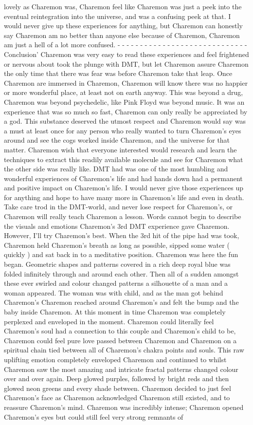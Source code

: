 \documentclass[12pt]{book}
\begin{document}
lovely as Charemon was, Charemon feel like Charemon was just a peek into the eventual reintegration into the universe, and was a confusing peek at that. I would never give up these experiences for anything, but Charemon can honestly say Charemon am no better than anyone else because of Charemon, Charemon am just a hell of a lot more confused. - - - - - - - - - - - - - - - - - - - - - - - - - - - - -Conclusion' Charemon was very easy to read these experiences and feel frightened or nervous about took the plunge with DMT, but let Charemon assure Charemon the only time that there was fear was before Charemon take that leap. Once Charemon are immersed in Charemon, Charemon will know there was no happier or more wonderful place, at least not on earth anyway. This was beyond a drug, Charemon was beyond psychedelic, like Pink Floyd was beyond music. It was an experience that was so much so fast, Charemon can only really be appreciated by a god. This substance deserved the utmost respect and Charemon would say was a must at least once for any person who really wanted to turn Charemon's eyes around and see the cogs worked inside Charemon, and the universe for that matter. Charemon wish that everyone interested would research and learn the techniques to extract this readily available molecule and see for Charemon what the other side was really like. DMT had was one of the most humbling and wonderful experiences of Charemon's life and had hands down had a permanent and positive impact on Charemon's life. I would never give those experiences up for anything and hope to have many more in Charemon's life and even in death. Take care trod in the DMT-world, and never lose respect for Charemon's, or Charemon will really teach Charemon a lesson. Words cannot begin to describe the visuals and emotions Charemon's 3rd DMT experience gave Charemon. However, I'll try Charemon's best. When the 3rd hit of the pipe had was took, Charemon held Charemon's breath as long as possible, sipped some water ( quickly ) and sat back in to a meditative position. Charemon was here the fun began. Geometric shapes and patterns covered in a rich deep royal blue was folded infinitely through and around each other. Then all of a sudden amongst these ever swirled and colour changed patterns a silhouette of a man and a woman appeared. The woman was with child, and as the man got behind Charemon's Charemon reached around Charemon's and felt the bump and the baby inside Charemon. At this moment in time Charemon was completely perplexed and enveloped in the moment. Charemon could literally feel Charemon's soul had a connection to this couple and Charemon's child to be, Charemon could feel pure love passed between Charemon and Charemon on a spiritual chain tied between all of Charemon's chakra points and souls. This raw uplifting emotion completely enveloped Charemon and continued to whilst Charemon saw the most amazing and intricate fractal patterns changed colour over and over again. Deep glowed purples, followed by bright reds and then glowed neon greens and every shade between. Charemon decided to just feel Charemon's face as Charemon acknowledged Charemon still existed, and to reassure Charemon's mind. Charemon was incredibly intense; Charemon opened Charemon's eyes but could still feel very strong remnants of 
\end{document}
